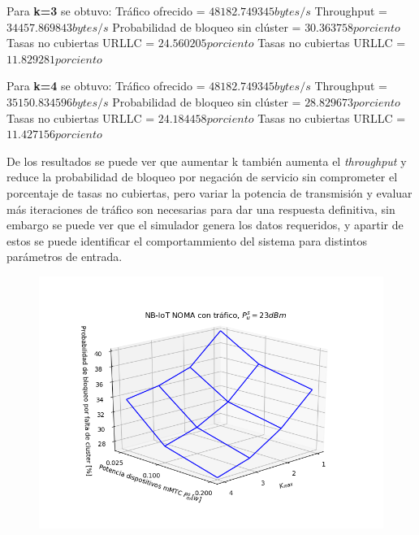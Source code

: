 Para \textbf{k=3} se obtuvo:\newline
Tráfico ofrecido = $48182.749345 bytes/s$ \newline
Throughput = $34457.869843 bytes/s$ \newline
Probabilidad de bloqueo sin clúster = $30.363758 porciento$ \newline
Tasas no cubiertas URLLC = $24.560205 porciento$ \newline
Tasas no cubiertas URLLC = $11.829281 porciento$ \newline

Para \textbf{k=4} se obtuvo:\newline
Tráfico ofrecido = $48182.749345 bytes/s$ \newline
Throughput = $35150.834596 bytes/s$ \newline
Probabilidad de bloqueo sin clúster = $28.829673 porciento$ \newline
Tasas no cubiertas URLLC = $24.184458 porciento$ \newline
Tasas no cubiertas URLLC = $11.427156 porciento$ \newline

De los resultados se puede ver que aumentar k también aumenta el \textit{throughput} y reduce la probabilidad de bloqueo por negación de servicio sin comprometer el porcentaje de tasas no cubiertas, pero variar la potencia de transmisión y evaluar más iteraciones de tráfico son necesarias para dar una respuesta definitiva, sin embargo se puede ver que el simulador genera los datos requeridos, y apartir de estos se puede identificar el comportammiento del sistema para distintos parámetros de entrada.

\begin{figure}[th]
    \centering
    \includegraphics[scale=1]{Figures/ResultadosTrafico/Figure_1.png}
    \decoRule
    \caption[]{}
    \label{fig:}
\end{figure}

